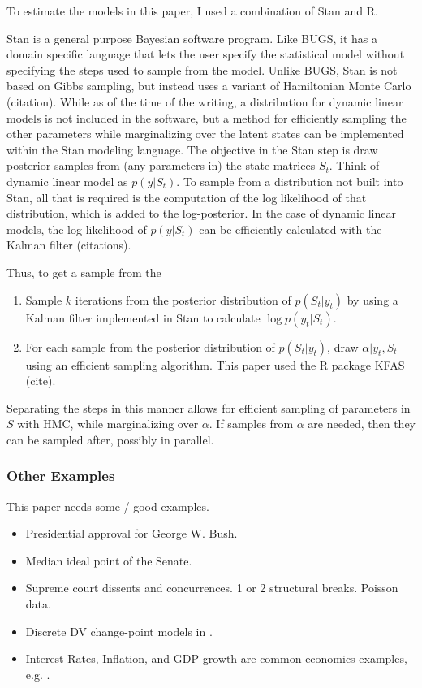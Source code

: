 \documentclass{article}
\begin{document}
To estimate the models in this paper, I used a combination of Stan and R.

Stan is a general purpose Bayesian software program.
Like BUGS, it has a domain specific language that lets the user specify the statistical model without specifying the steps used to sample from the model.
Unlike BUGS, Stan is not based on Gibbs sampling, but instead uses a variant of Hamiltonian Monte Carlo (citation).
While as of the time of the writing, a distribution for dynamic linear models is not included in the software, but a method for efficiently sampling the other parameters while marginalizing over the latent states can be implemented within the Stan modeling language.
The objective in the Stan step is draw posterior samples from (any parameters in) the state matrices $S_{t}$.
Think of dynamic linear model as  $p(y | S_{t})$. 
To sample from a distribution not built into Stan, all that is required is the computation of the log likelihood of that distribution, which is added to the log-posterior.
In the case of dynamic linear models, the log-likelihood of $p(y | S_{t})$ can be efficiently calculated with the Kalman filter (citations).

Thus, to get a sample from the
\begin{enumerate}
\item Sample $k$ iterations from the posterior distribution of $p(S_{t} | y_{t})$ by using a Kalman filter implemented in Stan to calculate $\log p(y_{t} | S_{t})$.
\item For each sample from the posterior distribution of $p(S_{t} | y_{t})$, draw $\alpha | y_{t}, S_{t}$ using an efficient sampling algorithm.
This paper used the R package KFAS (cite).
\end{enumerate}

Separating the steps in this manner allows for efficient sampling of parameters in $S$ with HMC, while marginalizing over $\alpha$.
If samples from $\alpha$ are needed, then they can be sampled after, possibly in parallel.

\subsubsection{Other Examples}

This paper needs some / good examples.

\begin{itemize}
\item Presidential approval for George W. Bush. \parencites{RatkovicEng2010}
\item Median ideal point of the Senate. \parencites{RatkovicEng2010}
\item Supreme court dissents and concurrences. 1 or 2 structural breaks. Poisson data. \parencite{CalderiaZorn1998}
\item Discrete DV change-point models in \parencite{spirling2007bayesian}.
\item Interest Rates, Inflation, and GDP growth are common economics examples, e.g. \textcite{GiordaniKohn2008}.
\end{itemize}
\end{document}
